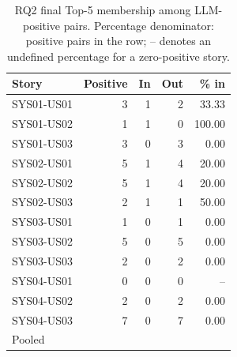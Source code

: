 \begin{table}[t]
\caption{RQ2 final Top-5 membership among LLM-positive pairs. Percentage denominator: positive pairs in the row; -- denotes an undefined percentage for a zero-positive story.}
\label{tab:rag-comparison}
\centering
\small
\begin{tabular}{lrrrr}
\hline
Story & Positive & In & Out & \% in \\
\hline
SYS01-US01 & 3 & 1 & 2 & 33.33 \\
SYS01-US02 & 1 & 1 & 0 & 100.00 \\
SYS01-US03 & 3 & 0 & 3 & 0.00 \\
SYS02-US01 & 5 & 1 & 4 & 20.00 \\
SYS02-US02 & 5 & 1 & 4 & 20.00 \\
SYS02-US03 & 2 & 1 & 1 & 50.00 \\
SYS03-US01 & 1 & 0 & 1 & 0.00 \\
SYS03-US02 & 5 & 0 & 5 & 0.00 \\
SYS03-US03 & 2 & 0 & 2 & 0.00 \\
SYS04-US01 & 0 & 0 & 0 & -- \\
SYS04-US02 & 2 & 0 & 2 & 0.00 \\
SYS04-US03 & 7 & 0 & 7 & 0.00 \\
\hline
Pooled & \StudyApplicableCount{} & \StudyRagOverlapCount{} & \StudyRagOutsideCount{} & \RqTwoOverlapPercent{} \\
\hline
\end{tabular}
\end{table}
